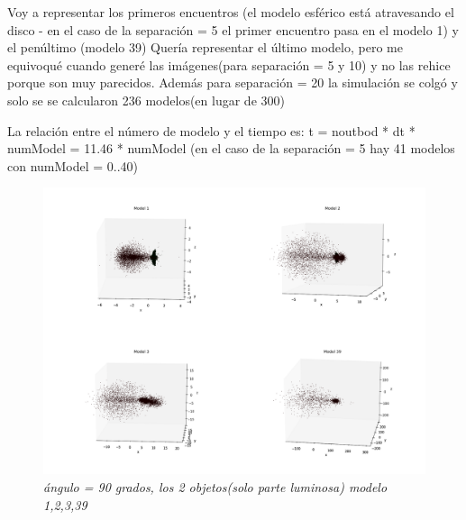 \documentclass[12pt]{article} %
\renewcommand{\=}[1]{\stackrel{#1}{=}} %
\theoremstyle{definition}
\theoremstyle{remark}
\begin{document}
Voy a representar los primeros encuentros (el modelo esférico está atravesando el disco - en el caso de la separación = 5 el primer encuentro pasa en el modelo 1) y el penúltimo (modelo 39)
\tiny Quería representar el último modelo, pero me equivoqué cuando generé las imágenes(para separación = 5 y 10) y no las rehice porque son muy parecidos. Además para separación = 20 la simulación se colgó y solo se se calcularon 236 modelos(en lugar de 300)

\normalsize
La relación entre el número de modelo y el tiempo es: t = noutbod * dt * numModel = 11.46 *  numModel
(en el caso de la separación = 5 hay 41 modelos con numModel = 0..40)



\begin{figure}[!ht]
 \centering
 \includegraphics[scale=0.2]{90deg_m_sep5.png}
 \caption{\emph{ ángulo = 90 grados, los 2 objetos(solo parte luminosa) modelo 1,2,3,39 }}
\end{figure}
\end{document}
